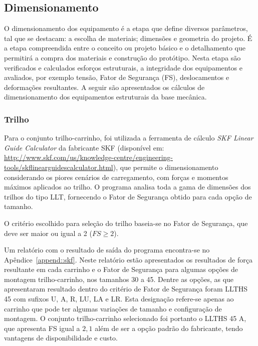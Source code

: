 \subsection{Dimensionamento}

O dimensionamento dos equipamento é a etapa que define diversos parâmetros, tal
que se destacam: a escolha de materiais; dimensões e geometria do projeto.
É a etapa compreendida entre o conceito ou projeto básico e o detalhamento que
permitirá a compra dos materiais e construção do protótipo. Nesta
etapa são verificados e calculados esforços estruturais, a integridade dos
equipamentos e avaliados, por exemplo tensão, Fator de Segurança (FS),
deslocamentos e deformações resultantes. A seguir são apresentados os cálculos
de dimensionamento dos equipamentos estruturais da base mecânica.

\subsubsection{Trilho}

Para o conjunto trilho-carrinho, foi utilizada a ferramenta de cálculo
\textit{SKF Linear Guide Calculator} da fabricante SKF (disponível em:
\url{http://www.skf.com/us/knowledge-centre/engineering-tools/skflinearguidescalculator.html}),
que permite o dimensionamento considerando os piores cenários de carregamento,
com forças e momentos máximos aplicados ao trilho.
O programa analisa toda a gama de dimensões dos trilhos do tipo LLT, fornecendo
o Fator de Segurança obtido para cada opção de tamanho.

O critério escolhido para seleção do trilho baseia-se no Fator de Segurança, que
deve ser maior ou igual a 2 ($FS\geq2$). 

Um relatório com o resultado de saída do programa encontra-se no Apêndice~\ref{append::skf}. 
Neste relatório estão apresentados os resultados de força resultante em cada
carrinho e o Fator de Segurança para algumas opções de montagem trilho-carrinho,
nos tamanhos 30 a 45. Dentre as opções, as que apresentaram resultado dentro do
critério de Fator de Segurança foram LLTHS 45 com sufixos U, A, R, LU, LA e LR.
Esta designação refere-se apenas ao carrinho que pode ter algumas variações de
tamanho e configuração de montagem. O conjunto trilho-carrinho selecionado foi
portanto o LLTHS 45 A, que apresenta FS igual a $2,1$ além de ser a opção padrão
do fabricante, tendo vantagens de disponibilidade e custo.

